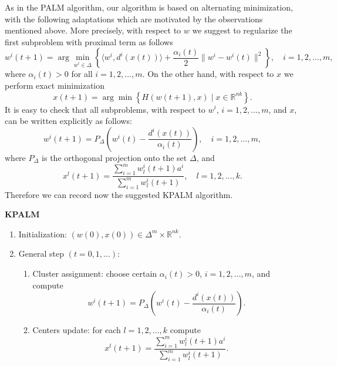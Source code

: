 \documentclass[11pt]{article}
\numberwithin{equation}{section}
\begin{document}
As in the PALM algorithm, our algorithm is based on alternating minimization, with the following adaptations which are motivated by the observations mentioned above. More precisely, with respect to $w$ we suggest to regularize the first subproblem with proximal term as follows
\begin{equation}
	w^i(t+1) = \arg\!\min\limits_{w^i \in \Delta} \left\lbrace \langle w^i , d^i(x(t)) \rangle + \frac{\alpha_i(t)}{2} \|w^i - w^i(t)\|^2 \right\rbrace, \quad i=1,2, \ldots, m , \label{State_w_update}
\end{equation}
where $\alpha_i(t) > 0$ for all $i=1,2, \ldots, m$. On the other hand, with respect to $x$ we perform exact minimization
\begin{equation}
	x(t+1) = \arg\!\min \left\lbrace H(w(t+1), x) \mid x \in \mathbb{R}^{nk} \right\rbrace . \label{State_x_update}
\end{equation}
It is easy to check that all subproblems, with respect to $w^i$, $i=1,2, \ldots, m$, and $x$, can be written explicitly  as follows:
\begin{equation}
w^i(t+1) = P_{\Delta} \left(w^i(t) - \frac{d^i(x(t))}{\alpha_i(t)}\right) , \quad i=1, 2, \ldots ,m , \label{StateEq7}
\end{equation}
where $P_{\Delta}$ is the orthogonal projection onto the set $\Delta$, and
\begin{equation}
x^l(t+1) = \frac{\sum_{i=1}^{m} w^i_l(t+1) a^i}{\sum_{i=1}^{m} w^i_l(t+1)} , \quad l=1, 2, \ldots ,k . \label{StateEq8}
\end{equation}
\newpage
Therefore we can record now the suggested KPALM algorithm.
\begin{framed}
\noindent \textbf{KPALM}
\begin{enumerate}[(1)]
	\item Initialization: $(w(0),x(0)) \in \Delta^m \times \mathbb{R}^{nk} .$
	\item General step $\left( t=0,1, \ldots \right)$:
	\begin{enumerate}[(2.1)]
		\item Cluster assignment: choose certain $\alpha_i(t) > 0$, $i=1,2, \ldots, m$, and compute
		\begin{equation}
			w^i(t+1) = P_{\Delta} \left(w^i(t) - \frac{d^i(x(t))}{\alpha_i(t)}\right) . \label{StateEq5}
		\end{equation}
		\item Centers update: for each $l=1, 2, \ldots ,k$ compute
		\begin{equation}
			x^l(t+1) = \frac{\sum_{i=1}^{m} w^i_l(t+1) a^i}{\sum_{i=1}^{m} w^i_l(t+1)} . \label{StateEq6}
		\end{equation}
	\end{enumerate}
\end{enumerate}
\end{framed}
\end{document}
